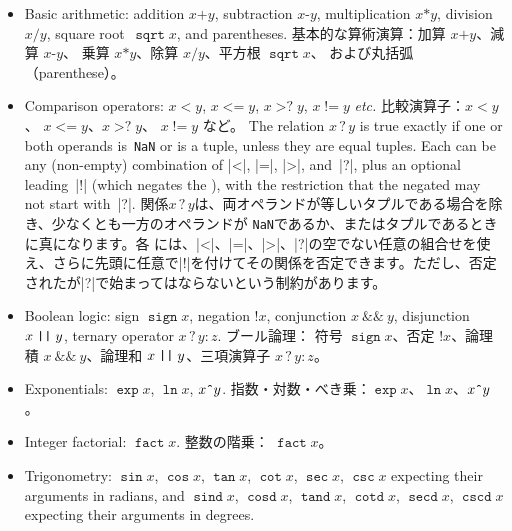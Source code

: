 \documentclass{ltxguide}
\newcommand\jpnewline{\vspace{3pt}\newline}
\providecommand\fpop[1]{\mathop{\texttt{#1}}}
\providecommand\fpbin[1]{\mathbin{\texttt{#1}}}
\providecommand\fprel[1]{\mathrel{\texttt{#1}}}
\providecommand\nan{\texttt{NaN}}
\begin{document}
\begin{itemize}
  \item Basic arithmetic: addition $x\fpbin{+}y$, subtraction $x\fpbin{-}y$,
    multiplication $x\fpbin{*}y$, division $x\fpbin{/}y$, square root~$\fpop{sqrt}{x}$,
    and parentheses.
    \jpnewline
       基本的な算術演算：加算 $x\fpbin{+}y$、減算 $x\fpbin{-}y$、
   乗算 $x\fpbin{*}y$、除算 $x\fpbin{/}y$、平方根 $\fpop{sqrt}{x}$、
   および丸括弧（parenthese）。
  \item Comparison operators: $x\fprel{<}y$,
    $x\fprel{<=}y$, $x\fprel{>?}y$,
    $x\fprel{!=}y$ \emph{etc.}
    \jpnewline
        比較演算子：$x\fprel{<}y$、
    $x\fprel{<=}y$、$x\fprel{>?}y$、
   $x\fprel{!=}y$ など。
 \jpnewline   
    The relation $x\fprel{?}y$ is true exactly if one or both operands is~\nan{} or is
   a tuple, unless they are equal tuples. Each 
   can be any (non-empty) combination of |<|, |=|, |>|, and~|?|, plus
   an optional leading~|!| (which negates the ), with
   the restriction that the negated  may not start with~|?|.
   \jpnewline
   関係$x\fprel{?}y$は、両オペランドが等しいタプルである場合を除き、少なくとも一方のオペランドが \nan{}であるか、またはタプルであるときに真になります。各 には、|<|、|=|、|>|、|?|の空でない任意の組合せを使え、さらに先頭に任意で|!|を付けてその関係を否定できます。ただし、否定されたが|?|で始まってはならないという制約があります。
\jpnewline
  \item Boolean logic: sign $\fpop{sign} x$,
    negation $\fpop{!}x$, conjunction
    $x\fprel{\&\&}y$, disjunction $x\fprel{\string|\string|}y$, ternary
    operator $x\fprel{?}y\fprel{:}z$.
    \jpnewline
    ブール論理：  符号 $\fpop{sign} x$、否定 $\fpop{!}x$、論理積 $x\fprel{\&\&}y$、論理和 $x\fprel{\string|\string|}y$、三項演算子 $x\fprel{?}y\fprel{:}z$。
  \item Exponentials: $\fpop{exp} x$, $\fpop{ln} x$, $x\mathord{\texttt{\^{}}}y$.
  \jpnewline
   指数・対数・べき乗：$\fpop{exp} x$、$\fpop{ln} x$、$x\mathord{\texttt{\^{}}}y$。
  \item Integer factorial: $\fpop{fact} x$.
  \jpnewline
  整数の階乗： $\fpop{fact} x$。
  \item Trigonometry: $\fpop{sin} x$, $\fpop{cos} x$, $\fpop{tan} x$, $\fpop{cot} x$, $\fpop{sec}
    x$, $\fpop{csc} x$ expecting their arguments in radians, and
    $\fpop{sind} x$, $\fpop{cosd} x$,
    $\fpop{tand} x$, $\fpop{cotd} x$,
    $\fpop{secd} x$, $\fpop{cscd} x$ expecting their
    arguments in degrees.

\end{itemize}
\end{document}
